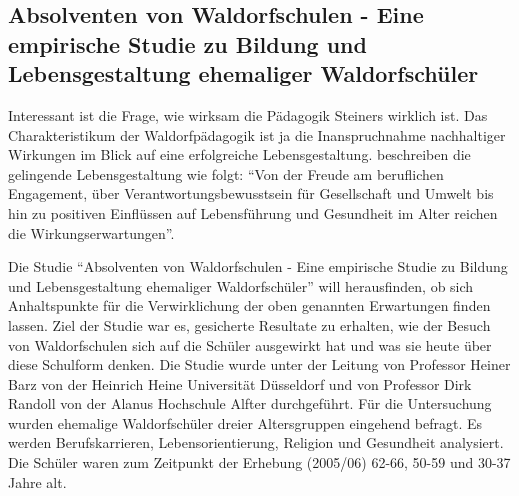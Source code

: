 
\subsection{Absolventen von Waldorfschulen - Eine empirische Studie zu Bildung und Lebensgestaltung ehemaliger Waldorfschüler} %
\label{Studie}

Interessant ist die Frage, wie wirksam die Pädagogik Steiners wirklich ist. Das Charakteristikum der Waldorfpädagogik ist ja die Inanspruchnahme nachhaltiger Wirkungen im Blick auf eine erfolgreiche Lebensgestaltung.
\citet[][S. 13]{randoll07} beschreiben die gelingende Lebensgestaltung wie folgt: \enquote{Von der Freude am beruflichen Engagement, über Verantwortungsbewusstsein für Gesellschaft und Umwelt bis hin zu positiven Einflüssen auf Lebensführung und Gesundheit im Alter reichen die Wirkungserwartungen}.

Die Studie \enquote{Absolventen von Waldorfschulen - Eine empirische Studie zu Bildung und Lebensgestaltung ehemaliger Waldorfschüler} will herausfinden, ob sich Anhaltspunkte für die Verwirklichung der oben genannten Erwartungen finden lassen.
Ziel der Studie war es, gesicherte Resultate zu erhalten, wie der Besuch von Waldorfschulen sich auf die Schüler ausgewirkt hat und was sie heute über diese Schulform denken.
Die Studie wurde unter der Leitung von Professor Heiner Barz von der Heinrich Heine Universität Düsseldorf und von Professor Dirk Randoll von der Alanus Hochschule Alfter durchgeführt. 
Für die Untersuchung wurden ehemalige Waldorfschüler dreier Altersgruppen eingehend befragt. 
Es werden Berufskarrieren, Lebensorientierung, Religion und Gesundheit analysiert. 
Die Schüler waren zum Zeitpunkt der Erhebung (2005/06) 62-66, 50-59 und 30-37 Jahre alt.   \citep[Vgl.][]{randoll07, paschen10}


